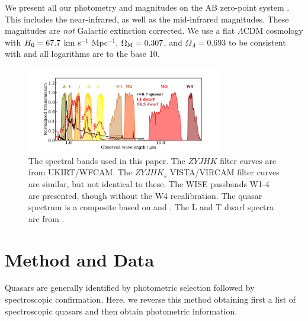 \documentclass[usenatbib]{mnras}
\begin{document}
We present all our photometry and magnitudes on the AB zero-point
system \citep{Oke_Gunn1983, Fukugita1996}.  This includes the
near-infrared, as well as the mid-infrared magnitudes. These
magnitudes are {\it not} Galactic extinction corrected. We use a flat
$\Lambda$CDM cosmology with $H_{\rm 0} = 67.7$ km s$^{-1}$ Mpc$^{-1}$,
$\Omega_{\rm M} = 0.307$, and $\Omega_{\Lambda} = 0.693$
\citet{Planck2016} to be consistent with \citet{Banados2016} and all
logarithms are to the base 10.


\begin{figure}
  \includegraphics[width=8.6cm, clip,trim=32mm 4mm 32mm 10mm]
  {../SEDs/filters_vs_QSOstars_z6pnt7.pdf}
  \centering
  \vspace{-12pt}
  \caption[]
  {The spectral bands used in this paper. 
    The $ZYJHK$ filter curves are from UKIRT/WFCAM.  
    The $ZYJHK_{s}$ VISTA/VIRCAM filter curves are similar, but not identical to these. 
    The WISE passbands W1-4 are presented, though without the \citet{Brown2014b} W4 recalibration. 
    The quasar spectrum is a composite based on \citet{VdB2001} and 
    \citet{Banados2016}. The L and T dwarf spectra are from \citet{Cushing2006}. }
  \label{fig:filters}
\end{figure}

\vspace{-16pt}
\section{Method and Data}
Quasars are generally identified by photometric selection followed by
spectroscopic confirmation. Here, we reverse this method obtaining
first a list of spectroscopic quasars and then obtain photometric
information.
\end{document}
